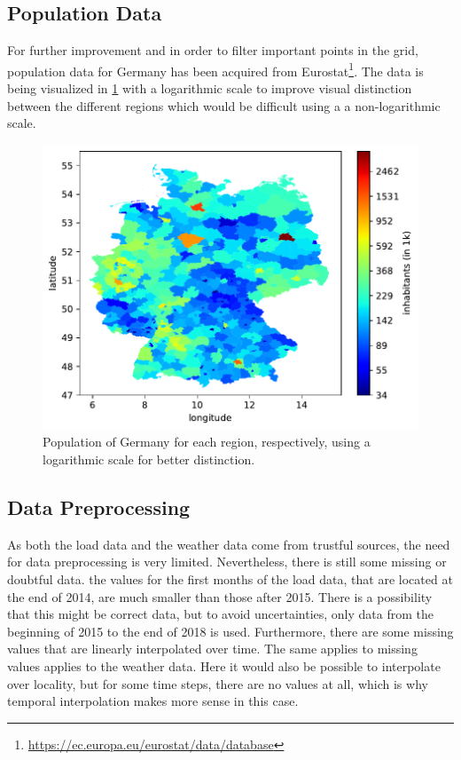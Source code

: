 \subsection*{Population Data}

For further improvement and in order to filter important points in the grid, population data for Germany has been acquired from Eurostat\footnote{\url{https://ec.europa.eu/eurostat/data/database}}. The data is being visualized in \cref{fig:demo2018_logscale} with a logarithmic scale to improve visual distinction between the different regions which would be difficult using a a non-logarithmic scale.\\

\begin{figure}[h!]%
\centering
\includegraphics[width=\textwidth]{plots/demo/demo2018_logscale}%
\caption{Population of Germany for each region, respectively, using a logarithmic scale for better distinction.}%
\label{fig:demo2018_logscale}%
\end{figure}


\subsection*{Data Preprocessing}

As both the load data and the weather data come from trustful sources, the need for data preprocessing is very limited. Nevertheless, there is still some missing or doubtful data. \Eg the values for the first months of the load data, that are located at the end of 2014, are much smaller than those after 2015. There is a possibility that this might be correct data, but to avoid uncertainties, only data from the beginning of 2015 to the end of 2018 is used. Furthermore, there are some missing values that are linearly interpolated over time. The same applies to missing values applies to the weather data. Here it would also be possible to interpolate over locality, but for some time steps, there are no values at all, which is why temporal interpolation makes more sense in this case.\\


